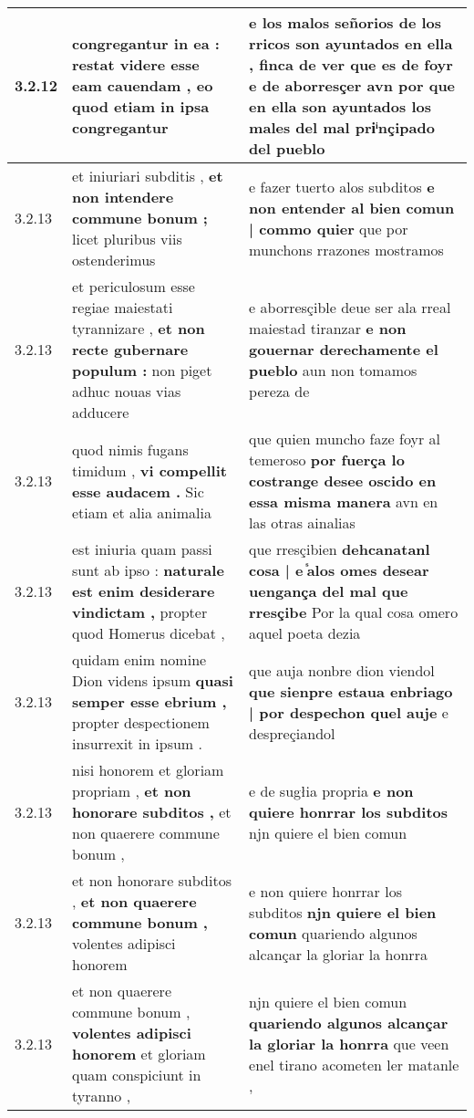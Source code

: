 \begin{tabular}{|p{1cm}|p{6.5cm}|p{6.5cm}|}
3.2.12 & congregantur in ea : \textbf{ restat videre esse eam cauendam , } eo quod etiam in ipsa congregantur & e los malos señorios de los rricos son ayuntados en ella , \textbf{ finca de ver que es de foyr e de aborresçer avn } por que en ella son ayuntados los males del mal priͥnçipado del pueblo \\\hline
3.2.13 & et iniuriari subditis , \textbf{ et non intendere commune bonum ; } licet pluribus viis ostenderimus & e fazer tuerto alos subditos \textbf{ e non entender al bien comun | commo quier } que por munchons rrazones mostramos \\\hline
3.2.13 & et periculosum esse regiae maiestati tyrannizare , \textbf{ et non recte gubernare populum : } non piget adhuc nouas vias adducere & e aborresçible deue ser ala rreal maiestad tiranzar \textbf{ e non gouernar derechamente el pueblo } aun non tomamos pereza de \\\hline
3.2.13 & quod nimis fugans timidum , \textbf{ vi compellit esse audacem . } Sic etiam et alia animalia & que quien muncho faze foyr al temeroso \textbf{ por fuerça lo costrange desee oscido en essa misma manera } avn en las otras ainalias \\\hline
3.2.13 & est iniuria quam passi sunt ab ipso : \textbf{ naturale est enim desiderare vindictam , } propter quod Homerus dicebat , & que rresçibien \textbf{ dehcanatanl cosa | e ᷤalos omes desear uengança del mal que rresçibe } Por la qual cosa omero aquel poeta dezia \\\hline
3.2.13 & quidam enim nomine Dion videns ipsum \textbf{ quasi semper esse ebrium , } propter despectionem insurrexit in ipsum . & que auja nonbre dion viendol \textbf{ que sienpre estaua enbriago | por despechon quel auje } e despreçiandol \\\hline
3.2.13 & nisi honorem et gloriam propriam , \textbf{ et non honorare subditos , } et non quaerere commune bonum , & e de sugłia propria \textbf{ e non quiere honrrar los subditos } njn quiere el bien comun \\\hline
3.2.13 & et non honorare subditos , \textbf{ et non quaerere commune bonum , } volentes adipisci honorem & e non quiere honrrar los subditos \textbf{ njn quiere el bien comun } quariendo algunos alcançar la gloriar la honrra \\\hline
3.2.13 & et non quaerere commune bonum , \textbf{ volentes adipisci honorem } et gloriam quam conspiciunt in tyranno , & njn quiere el bien comun \textbf{ quariendo algunos alcançar la gloriar la honrra } que veen enel tirano acometen ler matanle , \\\hline

\end{tabular}
